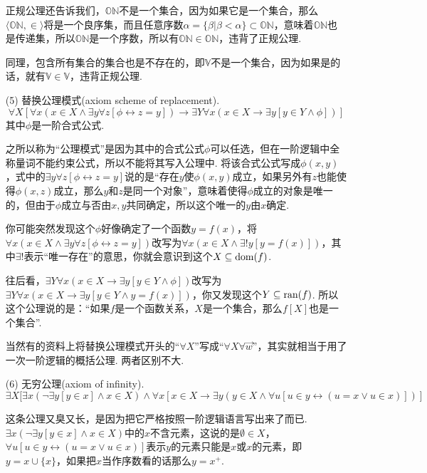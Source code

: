 \documentclass[main.tex]{subfiles}
\begin{document}
\begin{itemize}
\begin{note}
        正规公理还告诉我们，\(\mathbb{ON}\)不是一个集合，因为如果它是一个集合，那么\(\langle \mathbb{ON}, \in \rangle\)将是一个良序集，而且任意序数\(\alpha=\{\beta|\beta < \alpha\} \subset \mathbb{ON}\)，意味着\(\mathbb{ON}\)也是传递集，所以\(\mathbb{ON}\)是一个序数，所以有\(\mathbb{ON} \in \mathbb{ON}\)，违背了正规公理. 

        同理，包含所有集合的集合也是不存在的，即\(\mathbb{V}\)不是一个集合，因为如果是的话，就有\(\mathbb{V}\in\mathbb{V}\)，违背正规公理.
    \end{note}
    
    \item[(5)] 替换公理模式(axiom scheme of replacement).
    \[\forall X [\forall x(x \in X \wedge \exists y \forall z[\phi \leftrightarrow z=y]) \rightarrow \exists Y \forall x(x \in X \rightarrow \exists y[y \in Y \wedge \phi])]\]
    其中\(\phi\)是一阶合式公式.
    \begin{note}
        之所以称为“公理模式”是因为其中的合式公式\(\phi\)可以任选，但在一阶逻辑中全称量词不能约束公式，所以不能将其写入公理中. 将该合式公式写成\(\phi(x,y)\)，式中的\(\exists y \forall z[\phi \leftrightarrow z=y]\)说的是“存在\(y\)使\(\phi(x,y)\)成立，如果另外有\(z\)也能使得\(\phi(x,z)\)成立，那么\(y\)和\(z\)是同一个对象”，意味着使得\(\phi\)成立的对象是唯一的，但由于\(\phi\)成立与否由\(x,y\)共同确定，所以这个唯一的\(y\)由\(x\)确定. 

        你可能突然发现这个\(\phi\)好像确定了一个函数\(y=f(x)\)，将\(\forall x(x \in X \wedge \exists y \forall z[\phi \leftrightarrow z=y])\)改写为\(\forall x(x \in X \wedge \exists! y [y=f(x)])\)，其中\(\exists!\)表示“唯一存在”的意思，你就会意识到这个\(X \subseteq {\rm dom}(f)\).
        
        往后看，\(\exists Y \forall x(x \in X \rightarrow \exists y[y \in Y \wedge \phi])\)改写为\(\exists Y \forall x(x \in X \rightarrow \exists y[y \in Y \wedge y=f(x)])\)，你又发现这个\(Y\subseteq {\rm ran}(f)\). 所以这个公理说的是：“如果\(f\)是一个函数关系，\(X\)是一个集合，那么\(f[X]\)也是一个集合”.

        当然有的资料上将替换公理模式开头的“\(\forall X\)”写成“\(\forall X \forall \vec{w}\)”，其实就相当于用了一次一阶逻辑的概括公理. 两者区别不大.
    \end{note}

    \item[(6)] 无穷公理(axiom of infinity).
    \[\exists X[ \exists x(\neg \exists y[y \in x] \wedge x \in X) \wedge \forall x[x \in X \rightarrow \exists y (y \in X \wedge \forall u[u \in y \leftrightarrow (u=x \vee u \in x)])]\]
    \begin{note}
        这条公理又臭又长，是因为把它严格按照一阶逻辑语言写出来了而已. \(\exists x(\neg \exists y[y \in x] \wedge x \in X)\)中的\(x\)不含元素，这说的是\(\emptyset \in X\)，\(\forall u[u \in y \leftrightarrow (u=x \vee u \in x)]\)表示\(y\)的元素只能是\(x\)或\(x\)的元素，即\(y=x \cup \{x\}\)，如果把\(x\)当作序数看的话那么\(y=x^+\).


\end{note}
\end{itemize}
\end{document}
